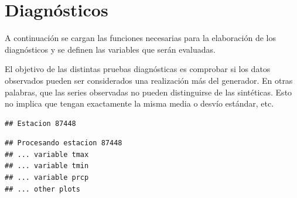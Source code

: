 \documentclass[
]{article}
\newenvironment{Shaded}{}{}
\newcommand{\CommentTok}[1]{\textcolor[rgb]{0.38,0.63,0.69}{\textit{#1}}}
\newcommand{\DataTypeTok}[1]{\textcolor[rgb]{0.56,0.13,0.00}{#1}}
\newcommand{\FloatTok}[1]{\textcolor[rgb]{0.25,0.63,0.44}{#1}}
\newcommand{\KeywordTok}[1]{\textcolor[rgb]{0.00,0.44,0.13}{\textbf{#1}}}
\newcommand{\NormalTok}[1]{#1}
\newcommand{\OperatorTok}[1]{\textcolor[rgb]{0.40,0.40,0.40}{#1}}
\newcommand{\StringTok}[1]{\textcolor[rgb]{0.25,0.44,0.63}{#1}}
\begin{document}
\hypertarget{diagnuxf3sticos}{%
\section{Diagnósticos}\label{diagnuxf3sticos}}

A continuación se cargan las funciones necesarias para la elaboración de los diagnósticos y se definen las variables que serán evaluadas.

\begin{Shaded}
\end{Shaded}

El objetivo de las distintas pruebas diagnósticas es comprobar si los datos observados pueden ser considerados una realización más del generador. En otras palabras, que las series observadas no pueden distinguirse de las sintéticas. Esto no implica que tengan exactamente la misma media o desvío estándar, etc.

\begin{verbatim}
## Estacion 87448
\end{verbatim}

\begin{verbatim}
## Procesando estacion 87448
## ... variable tmax
## ... variable tmin
## ... variable prcp
## ... other plots
\end{verbatim}
\end{document}
